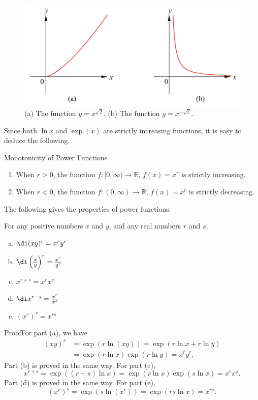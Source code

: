\begin{figure}[ht]
\centering
\includegraphics[scale=0.2]{Picture28.png}
\caption{ (a) The function $y=x^{\sqrt{2}}$.   (b) The function $y=x^{-\sqrt{2}}$.\fa}\label{figure28}
\end{figure}

Since both $\ln x$ and $\exp(x)$ are strictly increasing functions, it is easy to deduce the following.
\begin{highlight}{Monotonicity of Power Functions}
\begin{enumerate}[1.]
\item When $r>0$, the function $f:[0,\infty)\to\mathbb{R}$, $f(x)=x^r$ is strictly increasing.
\item When $r<0$, the function $f:(0,\infty)\to\mathbb{R}$, $f(x)=x^r$ is strictly decreasing.
\end{enumerate}
\end{highlight}

The following gives the properties of power functions.
\begin{proposition}{}
For any positive numbers $x$ and $y$, and any real numbers $r$ and $s$,
\begin{enumerate}[(a)]
\item $\di (xy)^r=x^ry^r$
\item $\di \left(\frac{x}{y}\right)^r=\frac{x^r}{y^r}$
\item $x^{r+s}=x^rx^s$
\item $\di x^{r-s}=\frac{x^r}{x^s}$
\item $(x^r)^s=x^{rs}$

\end{enumerate}
\end{proposition}
\begin{myproof}{Proof}For part (a), we have
\begin{align*}
(xy)^r&=\exp\left(r\ln(xy)\right)=\exp(r\ln x+r\ln y)\\&=\exp(r\ln x)\exp(r\ln y)=x^ry^r.
\end{align*}Part (b) is proved in the same way. For part (c),
\[x^{r+s}=\exp\left((r+s)\ln x\right)=\exp(r\ln x)\exp(s\ln x)=x^rx^s.\]
Part (d) is proved in the same way.  For part (e),
\[(x^r)^s=\exp\left(s\ln (x^r)\right)=\exp\left(rs\ln x\right)=x^{rs}.\]
\end{myproof}

